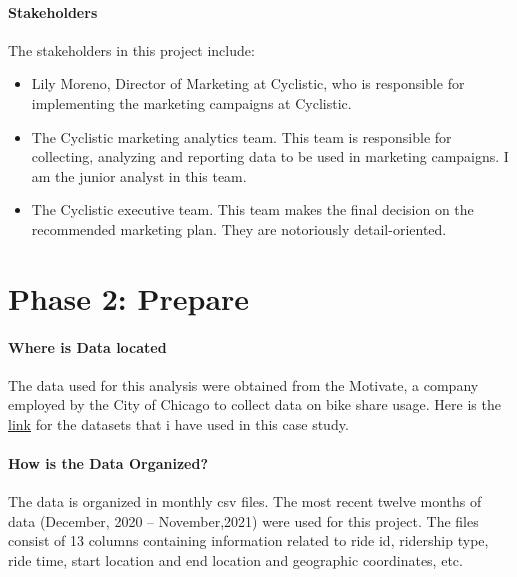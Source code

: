 \documentclass[
]{article}
\begin{document}
\hypertarget{stakeholders}{%
\paragraph{\texorpdfstring{\textbf{Stakeholders}}{Stakeholders}}\label{stakeholders}}

The stakeholders in this project include:

\begin{itemize}
\item
  Lily Moreno, Director of Marketing at Cyclistic, who is responsible
  for implementing the marketing campaigns at Cyclistic.
\item
  The Cyclistic marketing analytics team. This team is responsible for
  collecting, analyzing and reporting data to be used in marketing
  campaigns. I am the junior analyst in this team.
\item
  The Cyclistic executive team. This team makes the final decision on
  the recommended marketing plan. They are notoriously detail-oriented.
\end{itemize}

\hypertarget{phase-2-prepare}{%
\section{\texorpdfstring{\textbf{Phase 2:
Prepare}}{Phase 2: Prepare}}\label{phase-2-prepare}}

\hypertarget{where-is-data-located}{%
\paragraph{\texorpdfstring{\textbf{Where is Data
located}}{Where is Data located}}\label{where-is-data-located}}

The data used for this analysis were obtained from the Motivate, a
company employed by the City of Chicago to collect data on bike share
usage. Here is the
\href{https://divvy-tripdata.s3.amazonaws.com/index.html}{link} for the
datasets that i have used in this case study.

\hypertarget{how-is-the-data-organized}{%
\paragraph{\texorpdfstring{\textbf{How is the Data
Organized?}}{How is the Data Organized?}}\label{how-is-the-data-organized}}

The data is organized in monthly csv files. The most recent twelve
months of data (December, 2020 -- November,2021) were used for this
project. The files consist of 13 columns containing information related
to ride id, ridership type, ride time, start location and end location
and geographic coordinates, etc.
\end{document}
